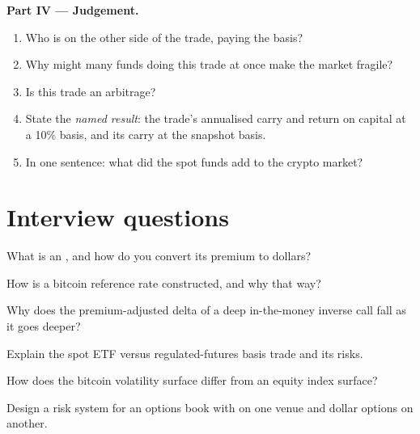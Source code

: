 \begin{problem}
\medskip\noindent\textbf{Part IV --- Judgement.}
\begin{enumerate}[resume]
\item Who is on the other side of the trade, paying the basis?
\item Why might many funds doing this trade at once make the market fragile?
\item Is this trade an arbitrage?
\item State the \emph{named result}: the trade's annualised carry and return on capital at a 10\% basis, and its carry at the snapshot
basis.
\item In one sentence: what did the spot funds add to the crypto market?
\end{enumerate}
\end{problem}

\section{Interview questions}

\begin{interviewq}\label{iq:m3:dated-futures-options-and-etfs:1}
What is an , and how do you convert its premium to dollars?
\end{interviewq}

\begin{interviewq}\label{iq:m3:dated-futures-options-and-etfs:2}
How is a bitcoin reference rate constructed, and why that way?
\end{interviewq}

\begin{interviewq}\label{iq:m3:dated-futures-options-and-etfs:3}
Why does the premium-adjusted delta of a deep in-the-money inverse call fall as it goes deeper?
\end{interviewq}

\begin{interviewq}\label{iq:m3:dated-futures-options-and-etfs:4}
Explain the spot ETF versus regulated-futures basis trade and its risks.
\end{interviewq}

\begin{interviewq}\label{iq:m3:dated-futures-options-and-etfs:5}
How does the bitcoin volatility surface differ from an equity index surface?
\end{interviewq}

\begin{interviewq}\label{iq:m3:dated-futures-options-and-etfs:6}
Design a risk system for an options book with  on one venue and dollar options on another.
\end{interviewq}
